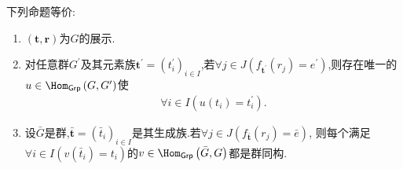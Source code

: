 \begin{proposition}{}{}
	下列命题等价:
	\begin{enumerate}
		\item $\left(\mathbf{t},\mathbf{r}\right)$为$G$的展示.
		\item 对任意群$G^{\prime}$及其元素族$\mathbf{t}^{\prime}=\left(t_{i}^{\prime}\right)_{i\in I}$,若$\forall j\in J\left(f_{\mathbf{t}^{\prime}}\left(r_{j}\right)=e^{\prime}\right)$,则存在唯一的$u\in\Hom_{\mathsf{Grp}}\left(G,G^{\prime}\right)$使
		\begin{align*}
			\forall i\in I\left(u\left(t_{i}\right)=t_{i}^{\prime}\right).
		\end{align*}
		\item 设$\bar{G}$是群,$\bar{\mathbf{t}}=\left(\bar{t}_{i}\right)_{i\in I}$是其生成族.若$\forall j\in J\left(f_{\bar{\mathbf{t}}}\left(r_{j}\right)=\bar{e}\right)$,
		则每个满足$\forall i\in I\left(v\left(\bar{t}_{i}\right)=t_{i}\right)$的$v\in\Hom_{\mathsf{Grp}}\left(\bar{G},G\right)$都是群同构.
	\end{enumerate}
\end{proposition}



































































